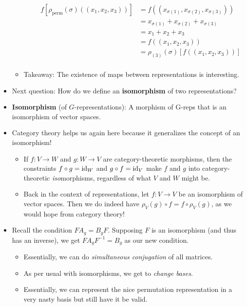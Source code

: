 \documentclass[../notes.tex]{subfiles}
\begin{document}
\begin{itemize}
\begin{itemize}
\begin{itemize}
\begin{align*}
                f[\rho_\text{perm}(\sigma)((x_1,x_2,x_3))] &= f((x_{\sigma(1)},x_{\sigma(2)},x_{\sigma(3)}))\\
                &= x_{\sigma(1)}+x_{\sigma(2)}+x_{\sigma(3)}\\
                &= x_1+x_2+x_3\tag*{Commutativity of addition}\\
                &= f((x_1,x_2,x_3))\\
                &= \rho_{(3)}(\sigma)[f((x_1,x_2,x_3))]\\
            \end{align*}
        \end{itemize}
        \item Takeaway: The existence of maps between representations is interesting.
    \end{itemize}
    \item Next question: How do we define an \textbf{isomorphism} of two representations?
    \item \textbf{Isomorphism} (of $G$-representations): A morphism of G-reps that is an isomorphism of vector spaces.
    \item Category theory helps us again here because it generalizes the concept of an isomorphism!
    \begin{itemize}
        \item If $f:V\to W$ and $g:W\to V$ are category-theoretic morphisms, then the constraints $f\circ g=\operatorname{id}_W$ and $g\circ f=\operatorname{id}_V$ make $f$ and $g$ into category-theoretic \emph{iso}morphisms, regardless of what $V$ and $W$ might be.
        \item Back in the context of representations, let $f:V\to V$ be an isomorphism of vector spaces. Then we do indeed have $\rho_V(g)\circ f=f\circ\rho_V(g)$, as we would hope from category theory!
    \end{itemize}
    \item Recall the condition $FA_g=B_gF$. Supposing $F$ is an isomorphism (and thus has an inverse), we get $FA_gF^{-1}=B_g$ as our new condition.
    \begin{itemize}
        \item Essentially, we can do \emph{simultaneous conjugation} of all matrices.
        \item As per usual with isomorphisms, we get to \emph{change bases}.
        \item Essentially, we can represent the nice permutation representation in a very nasty basis but still have it be valid.
    \end{itemize}

\end{itemize}
\end{document}
